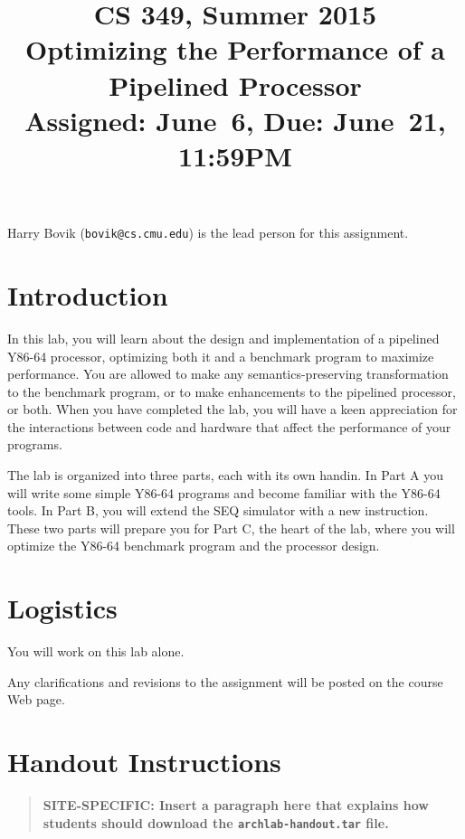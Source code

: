 \documentclass[11pt]{article}
\begin{document}
\title{CS 349, Summer 2015\\
Optimizing the Performance of a Pipelined Processor\\
Assigned: June~6, Due: June~21, 11:59PM}

\author{}
\date{}

\maketitle

Harry Bovik ({\tt bovik@cs.cmu.edu}) is the lead person for this
assignment.

\section{Introduction}

In this lab, you will learn about the design and implementation of a
pipelined Y86-64 processor, optimizing both it and a benchmark
program to maximize performance.
You are allowed to make any semantics-preserving
transformation to the benchmark program, or to make enhancements to
the pipelined processor, or both. When you have completed the lab, you
will have a keen appreciation for the interactions between code and
hardware that affect the performance of your programs.

The lab is organized into three parts, each with its own handin.  In
Part A you will write some simple Y86-64 programs and become familiar
with the Y86-64 tools. In Part B, you will extend the SEQ simulator with
a new instruction. These two parts will prepare you for Part C, the
heart of the lab, where you will optimize the Y86-64 benchmark program and
the processor design.

\section{Logistics}

You will work on this lab alone.  

Any clarifications and revisions to the assignment will be posted on
the course Web page.

\section{Handout Instructions}

\begin{quote}
\bf SITE-SPECIFIC: Insert a paragraph here that explains how students
should download the \texttt{archlab-handout.tar} file.
\end{quote}
\end{document}
